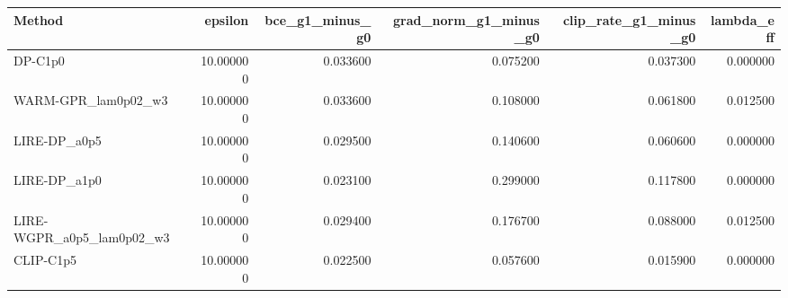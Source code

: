 \begin{tabular}{lrrrrr}
\toprule
Method & epsilon & bce_g1_minus_g0 & grad_norm_g1_minus_g0 & clip_rate_g1_minus_g0 & lambda_eff \\
\midrule
DP-C1p0 & 10.000000 & 0.033600 & 0.075200 & 0.037300 & 0.000000 \\
WARM-GPR_lam0p02_w3 & 10.000000 & 0.033600 & 0.108000 & 0.061800 & 0.012500 \\
LIRE-DP_a0p5 & 10.000000 & 0.029500 & 0.140600 & 0.060600 & 0.000000 \\
LIRE-DP_a1p0 & 10.000000 & 0.023100 & 0.299000 & 0.117800 & 0.000000 \\
LIRE-WGPR_a0p5_lam0p02_w3 & 10.000000 & 0.029400 & 0.176700 & 0.088000 & 0.012500 \\
CLIP-C1p5 & 10.000000 & 0.022500 & 0.057600 & 0.015900 & 0.000000 \\
\bottomrule
\end{tabular}
